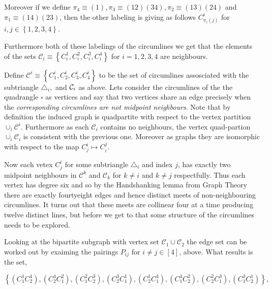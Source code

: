 \documentclass{unswthesis}
\begin{document}
Moreover if we define $\pi _{4}\equiv \left( 1\right) ,\pi _{3}\equiv \left(
12\right) \left( 34\right) ,\pi _{2}\equiv \left( 13\right) \left( 24\right) 
$ and $\pi _{1}\equiv \left( 14\right) \left( 23\right) $, then the other
labeling is giving as follows $C_{\pi _{i}\left( j\right) }^{i}$ for $i,j\in
\left\{ 1,2,3,4\right\} $.

Furthermore both of these labelings of the circumlines we get that the
elements of the sets $\mathcal{C}_{i}\equiv \left\{
C_{i}^{1},C_{i}^{2},C_{i}^{3},C_{i}^{4}\right\} $ for $i=1,2,3,4$ are
neighbours.

\bigskip

Define $\mathcal{C}^{i}\equiv \left\{
C_{1}^{i},C_{2}^{i},C_{3}^{i},C_{4}^{i}\right\} $ to be the set of
circumlines assosciated with the subtriangle $\triangle _{i},$ and $\mathcal{%
C}_{i}$ as above. Lets consider the circumlines of the the quadrangle $%
\square $ as vertices and say that two vertices share an edge precisely when
the \textit{corresponding circumlines are not midpoint neighbours}. Note
that by definition the induced graph is quadpartite with respect to the
vertex partition $\cup _{i}\mathcal{C}^{i}$. Furthermore as each $\mathcal{C}%
_{i}$ contains no neighbours, the vertex quad-partion $\cup _{i}\mathcal{C}%
_{i}$ is consistent with the previous one. Moreover as graphs they are
isomorphic with respect to the map $C_{j}^{i}\mapsto C_{i}^{j}$.

Now each vetex $C_{j}^{i}$ for some subtriangle $\triangle _{i}$ and index $%
j $, has exactly two midpoint neighbours in $\mathcal{C}^{k}$ and $\mathcal{C%
}_{k}$ for $k\neq i$ and $k\neq j$ respectfully. Thus each vertex has degree
six and so by the Handshanking lemma from Graph Theory there are exactly
fourtyeight edges and hence distinct meets of non-neighbouring circumlines.
It turns out that these meets are collinear four at a time producing twelve
distinct lines, but before we get to that some structure of the circumlines
needs to be explored.

\bigskip

Looking at the bipartite subgraph with vertex set $\mathcal{C}_{1}\cup 
\mathcal{C}_{2}$ the edge set can be worked out by exaiming the pairings $%
P_{ij}$ for $i\neq j\in \left[ 4\right] $, above. What results is the set,

\begin{equation*}
\left\{ \left( C_{1}^{1}C_{2}^{4}\right) ,\left( C_{2}^{4}C_{1}^{2}\right)
,\left( C_{1}^{2}C_{2}^{3}\right) ,\left( C_{2}^{3}C_{1}^{1}\right) ,\left(
C_{2}^{1}C_{1}^{4}\right) ,\left( C_{1}^{4}C_{2}^{2}\right) ,\left(
C_{2}^{2}C_{1}^{3}\right) ,\left( C_{1}^{3}C_{2}^{1}\right) \right\} , 
\end{equation*}
\end{document}
